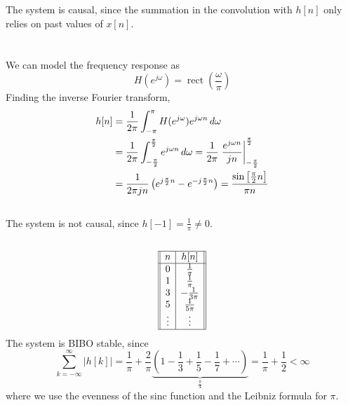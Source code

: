 \documentclass{article}
\DeclareMathOperator{\rect}{rect}
\begin{document}
\subsection{}

The system is causal, since the summation in the convolution with \(h[n]\) only relies on past values of \(x[n]\).

\section{}

\subsection{}

We can model the frequency response as
\begin{equation}
    H(e^{j \omega}) = \rect\left(\frac{\omega}{\pi}\right)
\end{equation}
Finding the inverse Fourier transform,
\begin{align}
    h[n] &= \frac{1}{2\pi} \int_{-\pi}^\pi H(e^{j \omega}) e^{j \omega n} \, d\omega \\
    &= \frac{1}{2\pi} \int_{-\frac{\pi}{2}}^{\frac{\pi}{2}} e^{j \omega n} \, d\omega = \frac{1}{2\pi} \eval{\frac{e^{j \omega n}}{jn}}_{-\frac{\pi}{2}}^{\frac{\pi}{2}} \\
    &= \frac{1}{2\pi j n} \left(e^{j \frac{\pi}{2} n} - e^{-j \frac{\pi}{2} n}\right) = \frac{\sin\left[\frac{\pi}{2} n\right]}{\pi n}
\end{align}

\subsection{}

The system is not causal, since \(h[-1] = \frac{1}{\pi} \neq 0\).

\subsection{}

\begin{equation}
    \begin{array}[]{||c|c||}
        \hline
        n & h[n] \\
        \hline
        0 & \frac{1}{\pi} \\
        1 & \frac{1}{\pi} \\
        3 & -\frac{1}{3\pi} \\
        5 & \frac{1}{5\pi} \\
        \vdots & \vdots \\
        \hline
    \end{array}
\end{equation}
The system is BIBO stable, since
\begin{equation}
    \sum_{k = -\infty}^\infty |h[k]| = \frac{1}{\pi} + \frac{2}{\pi} \underbrace{\left(1 - \frac{1}{3} + \frac{1}{5} - \frac{1}{7} + \cdots\right)}_{\frac{\pi}{4}} = \frac{1}{\pi} + \frac{1}{2} < \infty
\end{equation}
where we use the evenness of the sinc function and the Leibniz formula for \(\pi\).
\end{document}
